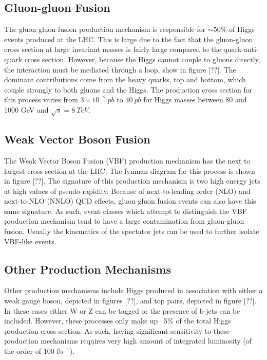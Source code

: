 \subsection{Gluon-gluon Fusion}
\label{sec:ggHiggs}

The gluon-gluon fusion production mechanism is responsible for $\sim 50\%$ of 
Higgs events produced at the LHC.  This is large due to the fact that the 
gluon-gluon cross section at large invariant masses is fairly large 
compared to the quark-anti-quark cross section.  
However, because the Higgs cannot couple to gluons directly, the interaction 
must be mediated through a loop, show in figure [??].  The dominant 
contributions 
come from the heavy quarks, top and bottom, which couple strongly to both
gluons and the Higgs.  The production cross section for
this process varies from $3\times10^{-2}~pb$ to $40~pb$  for Higgs masses 
between 80 and 1000 GeV and $\sqrt{s}=8~TeV$.

\subsection{Weak Vector Boson Fusion}
\label{sec:VBFHiggs}

The Weak Vector Boson Fusion (VBF) production mechanism has the next to
largest cross section at the LHC.  The fynman diagram for this process is 
shown in figure [??].  The signature of this production mechanism is two 
high energy jets at high values of pseudo-rapidity.  Because of next-to-leading
order (NLO) and next-to-NLO (NNLO) QCD effects, gluon-gluon fusion events can
also have this same signature.  As such, event classes which attempt to 
distinguish the VBF production mechanism tend to have a large contamination 
from gluon-gluon fusion.  Usually the kinematics of the spectator jets
can be used to further isolate VBF-like events. 

\subsection{Other Production Mechanisms}
\label{sec:VHiggs}

Other production mechanisms include Higgs produced in association with either
a weak gauge boson, depicted in figures [??], and top pairs, depicted in 
figure [??].  In these cases either W or Z can be tagged or the presence of 
b-jets can be included.  However, these processes only make up ~5\% of the 
total Higgs production cross section.  As such, having significant sensitivity
to these production mechanisms requires very high amount of integrated 
luminosity (of the order of 100 fb$^{-1}$). 

